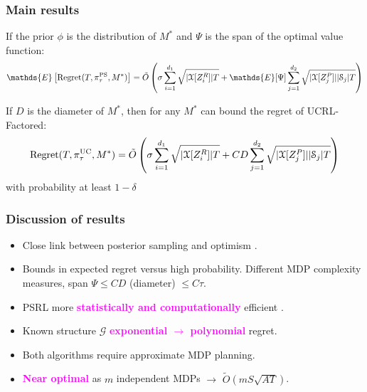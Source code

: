 \documentclass{beamer}
\newlength{\wideitemsep}
\let\olditem\item
\renewcommand{\item}{\setlength{\itemsep}{\wideitemsep}\olditem}
\newcommand{\Exp}{\mathds{E}}
\newcommand{\Xc}{\mathcal{X}}
\newcommand{\Gc}{\mathcal{G}}
\newcommand{\Sc}{\mathcal{S}}
\newcommand{\bspace}{\vspace{3mm}}
\newcommand{\hilite}[1]{\textcolor{magenta}{\textbf{#1}}}
\begin{document}
\begin{frame}
\frametitle{Main results}
\begin{theorem}
\label{thm: reg PSRL}
If the prior $\phi$ is the distribution of $M^*$ and $\Psi$ is the span of the optimal value function:
\footnotesize
\begin{equation}
    \Exp \left[\mathrm{Regret}(T, \pi^{\rm PS}_{\tau}, M^*) \right] =
    \tilde{O}\left( \sigma \sum_{i=1}^{d_1} \sqrt{ | \Xc[Z^R_i] |T} + \Exp[ \Psi ] \sum_{j=1}^{d_2} \sqrt{|\Xc[Z^P_j]| |\Sc_j| T} \right)
\end{equation}
\end{theorem}


\begin{theorem}
\label{thm: reg UCRL-Factored}
If $D$ is the diameter of $M^*$, then for any $M^*$ can bound the regret of UCRL-Factored:
\footnotesize
\begin{equation}
    \mathrm{Regret}(T, \pi^{\rm UC}_{\tau}, M^*) =
    \tilde{O}\left( \sigma \sum_{i=1}^{d_1} \sqrt{ | \Xc[Z^R_i] |T} + C D \sum_{j=1}^{d_2} \sqrt{|\Xc[Z^P_j]| |\Sc_j| T} \right)
\end{equation}
\normalsize
with probability at least $1-\delta$
\end{theorem}
\end{frame}

\begin{frame}
\frametitle{Discussion of results}

\begin{itemize}
    \item Close link between posterior sampling and optimism \cite{russo2013}.
    \bspace
    \item Bounds in expected regret versus high probability. Different MDP complexity measures, span $\Psi \le CD$ (diameter) $\le C \tau$.
    \bspace
    \item PSRL more \hilite{statistically and computationally} efficient \cite{osband2013more}.
    \bspace
    \item Known structure $\Gc$ \hilite{exponential $\rightarrow$ polynomial} regret.
    \bspace
    \item Both algorithms require approximate MDP planning.
    \bspace
    \item \hilite{Near optimal} as $m$ independent MDPs $\rightarrow$ $\tilde{O}(mS\sqrt{AT})$.

\end{itemize}
\end{frame}
\end{document}
